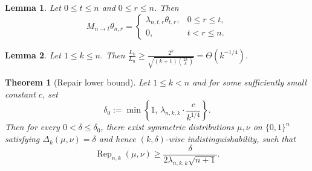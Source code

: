 \documentclass[10pt,a4paper]{amsart}
\newtheorem{lemma}{Lemma}
\newtheorem{theorem}{Theorem}
\begin{document}
\begin{lemma}
\label{lem:hahn-measure-intertwining}
Let \(0\le t\le n\) and \(0\le r\le n\). Then
\[
    M_{n\to t}\theta_{n,r}
    =
    \begin{cases}
        \lambda_{n,t,r}\theta_{t,r},
            & 0\le r\le t,\\[1ex]
        0,
            & t<r\le n.
    \end{cases}
\]
\end{lemma}

\begin{lemma}
\label{lem:l1-ratio-simple-lower}
Let \(1\le k\le n\). Then $\frac{L_k}{L_n}\ge\frac{2^k}{\sqrt{(k+1)\binom{2k}{k}}}=\Theta(k^{-1/4})$.
\end{lemma}

\begin{theorem}[Repair lower bound]
\label{thm:symmetric-repair-lower}
Let \(1\le k<n\) and for some sufficiently small constant $c$, set
\[
    \delta_0
    :=
    \min\left\{
        1,\,
        \lambda_{n,k,k}\cdot\frac{c}{k^{1/4}}
    \right\}.
\]
Then for every \(0<\delta\le \delta_0\), there exist symmetric
distributions \(\mu,\nu\) on \(\{0,1\}^n\) satisfying $\Delta_k(\mu,\nu)=\delta$
and hence \((k,\delta)\)-wise indistinguishability, such that
\[
    \operatorname{Rep}_{n,k}(\mu,\nu)
    \ge
    \frac{\delta}
         {2\lambda_{n,k,k}\sqrt{n+1}}.
\]
\end{theorem}
\end{document}
